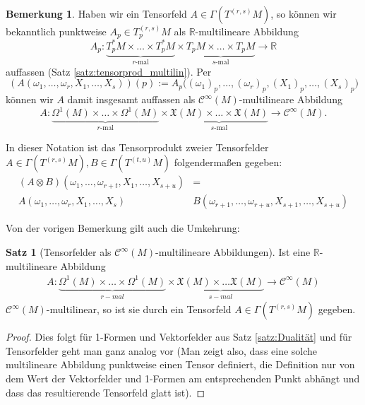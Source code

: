 \documentclass[a4paper]{scrbook}
\numberwithin{equation}{chapter}
\newcommand{\R}{\mathbb{R}}
\newcommand{\sC}{\mathcal{C}^{\infty}}
\newcommand{\vf}{\mathfrak{X}}
\theoremstyle{definition}
\newtheorem{satz}[defn]{Satz}
\newtheorem{bem}[defn]{Bemerkung}
\begin{document}
		\begin{bem}\label{bem:Tensorprodukt_mulitilin}
			Haben wir ein Tensorfeld $A \in \Gamma(T^{(r,s)}M)$, so können wir bekanntlich punktweise $A_p \in T^{(r,s)}_pM$ als $\R$-multilineare Abbildung
			\[A_p\colon \underbrace{T_p^*M \times \dots \times T_p^*M}_\text{$r$-mal} \times \underbrace{T_pM \times \dots \times T_pM}_\text{$s$-mal} \to \R\]
			auffassen (Satz \ref{satz:tensorprod_multilin}). Per
			\[(A(\omega_1,\dots,\omega_r, X_1,\dots,X_s))(p) := A_p\Big((\omega_1)_p,\dots,(\omega_r)_p, (X_1)_p,\dots,(X_s)_p\Big)\]
			können wir $A$ damit insgesamt auffassen als $\sC(M)$-multilineare Abbildung
			\[A\colon \underbrace{\Omega^1(M) \times \dots \times \Omega^1(M)}_\text{$r$-mal} \times \underbrace{\vf(M) \times \dots \times \vf(M)}_\text{$s$-mal} \to \sC(M).\]
			
			In dieser Notation ist das Tensorprodukt zweier Tensorfelder $A\in\Gamma(T^{(r,s)}M), B\in \Gamma(T^{(t,u)}M)$ folgendermaßen gegeben:
			\begin{align*}
				(A\otimes B)(\omega_1,\ldots,\omega_{r+t},X_1,\ldots,X_{s+u})&=\\
				A(\omega_1,\ldots,\omega_r,X_1,\ldots,X_s) &B(\omega_{r+1},\ldots,\omega_{r+u},X_{s+1},\ldots,X_{s+u})
			\end{align*}
		\end{bem}
		Von der vorigen Bemerkung gilt auch die Umkehrung:
		\begin{satz}[Tensorfelder als $\sC(M)$-multilineare Abbildungen]
			Ist eine $\R$-multilineare Abbildung
			\begin{align*}
				A\colon \underbrace{\Omega^1(M)\times\dots\times\Omega^1(M)}_{r-mal}\times\underbrace{\vf(M)\times\dots\vf(M)}_{s-mal}\rightarrow \sC(M)
			\end{align*}
			$\sC(M)$-multilinear, so ist sie durch ein Tensorfeld $A \in \Gamma(T^{(r,s)}M)$ gegeben.
			\begin{proof}
				Dies folgt für 1-Formen und Vektorfelder aus Satz \ref{satz:Dualität} und für Tensorfelder geht man ganz analog vor (Man zeigt also, dass eine solche multilineare Abbildung punktweise einen Tensor definiert, die Definition nur von dem Wert der Vektorfelder und 1-Formen am entsprechenden Punkt abhängt und dass das resultierende Tensorfeld glatt ist).
			\end{proof}
		\end{satz}
\end{document}
